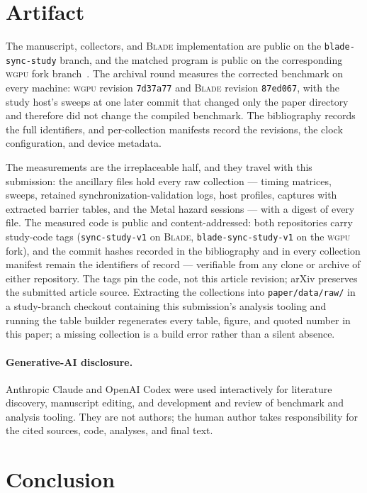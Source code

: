 \documentclass[10pt,twocolumn]{article}
\newcommand{\blade}{\textsc{Blade}}
\newcommand{\wgpu}{\textsc{wgpu}}
\begin{document}
\section{Artifact}

The manuscript, collectors, and \blade{} implementation are public on the
\texttt{blade-sync-study} branch, and the matched program is public on the
corresponding \wgpu{} fork branch~\cite{blade,wgpu-study}. The archival round
measures the corrected benchmark on every machine: \wgpu{} revision
\texttt{7d37a77} and \blade{} revision \texttt{87ed067}, with the study
host's sweeps at one later commit that changed only the paper directory and
therefore did not change the compiled benchmark. The bibliography records the
full identifiers, and per-collection manifests record the revisions, the clock
configuration, and device metadata.

The measurements are the irreplaceable half, and they travel with this
submission: the ancillary files hold every raw collection --- timing
matrices, sweeps, retained synchronization-validation logs, host profiles,
captures with extracted barrier tables, and the Metal hazard sessions ---
with a digest of every file. The measured code is public and
content-addressed: both repositories carry study-code tags
(\texttt{sync-study-v1} on \blade{}, \texttt{blade-sync-study-v1} on the
\wgpu{} fork), and the commit hashes recorded in the bibliography and in every
collection manifest remain the identifiers of record --- verifiable from any
clone or archive of either repository. The tags pin the code, not this article
revision; arXiv preserves the submitted article source. Extracting the
collections into \texttt{paper/data/raw/} in a study-branch checkout containing
this submission's analysis tooling and running the table builder regenerates
every table, figure, and quoted number in this paper; a missing collection is a
build error rather than a silent absence.

\paragraph{Generative-AI disclosure.}
Anthropic Claude and OpenAI Codex were used interactively for literature
discovery, manuscript editing, and development and review of benchmark and
analysis tooling. They are not authors; the human author takes responsibility
for the cited sources, code, analyses, and final text.

\section{Conclusion}
\end{document}
